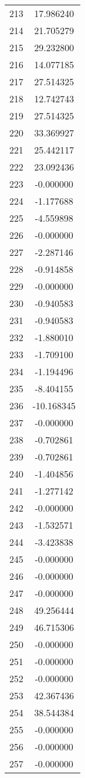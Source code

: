 \documentclass[12pt]{article}
\begin{document}
\begin{longtable}{@{}cc@{}}
213 & 17.986240 \\
214 & 21.705279 \\
215 & 29.232800 \\
216 & 14.077185 \\
217 & 27.514325 \\
218 & 12.742743 \\
219 & 27.514325 \\
220 & 33.369927 \\
221 & 25.442117 \\
222 & 23.092436 \\
223 & -0.000000 \\
224 & -1.177688 \\
225 & -4.559898 \\
226 & -0.000000 \\
227 & -2.287146 \\
228 & -0.914858 \\
229 & -0.000000 \\
230 & -0.940583 \\
231 & -0.940583 \\
232 & -1.880010 \\
233 & -1.709100 \\
234 & -1.194496 \\
235 & -8.404155 \\
236 & -10.168345 \\
237 & -0.000000 \\
238 & -0.702861 \\
239 & -0.702861 \\
240 & -1.404856 \\
241 & -1.277142 \\
242 & -0.000000 \\
243 & -1.532571 \\
244 & -3.423838 \\
245 & -0.000000 \\
246 & -0.000000 \\
247 & -0.000000 \\
248 & 49.256444 \\
249 & 46.715306 \\
250 & -0.000000 \\
251 & -0.000000 \\
252 & -0.000000 \\
253 & 42.367436 \\
254 & 38.544384 \\
255 & -0.000000 \\
256 & -0.000000 \\
257 & -0.000000 \\

\end{longtable}
\end{document}
